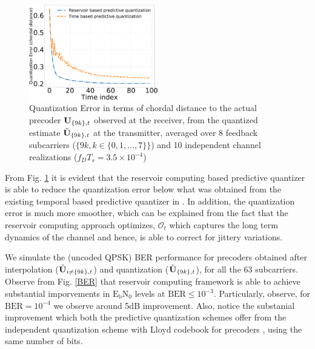 \documentclass[conference]{IEEEtran}
\begin{document}
\begin{figure}[h]
\centering
\includegraphics[width=0.5\textwidth]{images/qtizErr.pdf}
\caption{Quantization Error in terms of chordal distance to the actual precoder ${\bf U}_{\{9k\},t}$ observed at the receiver, from the quantized estimate $\tilde{{\bf U}}_{\{9k\},t}$ at the transmitter, averaged over 8 feedback subcarriers ($\{9k, k \in \{0,1,\ldots,7\}\}$) and 10 independent channel realizations ($f_DT_s=3.5\times10^{-4}$)}
\label{qtiz_err}
\end{figure}

From Fig. \ref{qtiz_err} it is evident that the reservoir computing based predictive quantizer is able to reduce the quantization error below what was obtained from the existing temporal based predictive quantizer in \cite{6891198}. In addition, the quantization error is much more smoother, which can be explained from the fact that the reservoir computing approach optimizes, $\mathcal{O}_t$ which captures the long term dynamics of the channel and hence, is able to correct for jittery variations.

We simulate the (uncoded QPSK) BER performance for precoders obtained after interpolation ($\tilde{{\bf U}}_{i\neq\{9k\},t}$) and quantization ($\tilde{{\bf U}}_{\{9k\},t}$), for all the 63 subcarriers. Observe from Fig. \ref{BER} that reservoir computing framework is able to achieve substantial imporvements in $\text{E}_\text{b}\text{N}_0$ levels at $\text{BER}\leq 10^{-3}$. Particularly, observe, for $\text{BER}=10^{-4}$ we observe around 5dB improvement. Also, notice the substanial improvement which both the predictive quantization schemes offer from the independent quantization scheme with Lloyd codebook for precoders \cite{6678348}, using the same number of bits.
\end{document}
